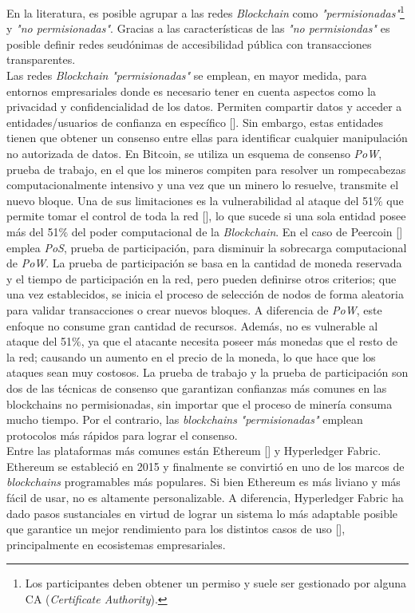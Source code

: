 En la literatura, es posible agrupar a las redes \emph{Blockchain} como \emph{"permisionadas"}\footnote{Los participantes deben obtener un permiso y suele ser gestionado por alguna CA (\emph{Certificate Authority}).} y \emph{"no permisionadas"}. Gracias a las caracter\'isticas de las \emph{"no permisiondas"} es posible definir redes seud\'onimas de accesibilidad p\'ublica con transacciones transparentes.\\

Las redes \emph{Blockchain} \emph{"permisionadas"} se emplean, en mayor medida, para entornos empresariales donde es necesario tener en cuenta aspectos como la privacidad y confidencialidad de los datos. Permiten compartir datos y acceder a entidades/usuarios de confianza en espec\'ifico [\cite{xu2017taxonomy}]. Sin embargo, estas entidades tienen que obtener un consenso entre ellas para identificar cualquier manipulaci\'on no autorizada de datos. En Bitcoin, se utiliza un esquema de consenso \emph{PoW}, prueba de trabajo, en el que los mineros compiten para resolver un rompecabezas computacionalmente intensivo y una vez que un minero lo resuelve, transmite el nuevo bloque. Una de sus limitaciones es la vulnerabilidad al ataque del 51$\%$ que permite tomar el control de toda la red [\cite{narayanan2016bitcoin}], lo que sucede si una sola entidad posee m\'as del 51$\%$ del poder computacional de la \emph{Blockchain}. En el caso de Peercoin [\cite{king2012ppcoin}] emplea \emph{PoS}, prueba de participaci\'on, para disminuir la sobrecarga computacional de \emph{PoW}. La prueba de participaci\'on se basa en la cantidad de moneda reservada y el tiempo de participaci\'on en la red, pero pueden definirse otros criterios; que una vez establecidos, se inicia el proceso de selecci\'on de nodos de forma aleatoria para validar transacciones o crear nuevos bloques. A diferencia de \emph{PoW}, este enfoque no consume gran cantidad de recursos. Adem\'as, no es vulnerable al ataque del 51$\%$, ya que el atacante necesita poseer m\'as monedas que el resto de la red; causando un aumento en el precio de la moneda, lo que hace que los ataques sean muy costosos. La prueba de trabajo y la prueba de participaci\'on son dos de las t\'ecnicas de consenso que garantizan confianzas m\'as comunes en las blockchains no permisionadas, sin importar que el proceso de miner\'ia consuma mucho tiempo. Por el contrario, las \emph{blockchains} \emph{"permisionadas"} emplean protocolos m\'as r\'apidos para lograr el consenso.\\

Entre las plataformas m\'as comunes est\'an Ethereum [\cite{antonopoulos2018mastering}] y Hyperledger Fabric. Ethereum se estableci\'o en 2015 y finalmente se convirti\'o en uno de los marcos de \emph{blockchains} programables m\'as populares. Si bien Ethereum es m\'as liviano y m\'as f\'acil de usar, no es altamente personalizable. A diferencia, Hyperledger Fabric ha dado pasos sustanciales en virtud de lograr un sistema lo m\'as adaptable posible que garantice un mejor rendimiento para los distintos casos de uso [\cite{valenta2017comparison}], principalmente en ecosistemas empresariales.


